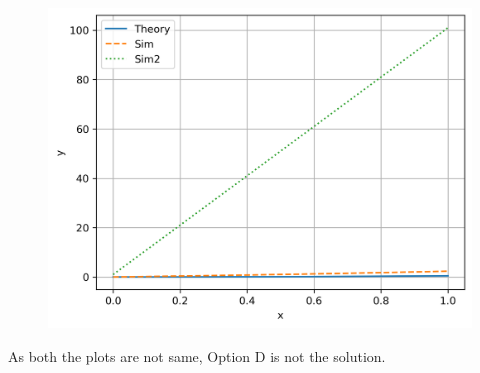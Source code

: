 \documentclass[journal]{IEEEtran}
\begin{document}
\begin{figure}[h]
    \centering
    \includegraphics[width=\textwidth]{figs/fig.png}
\end{figure}

As both the plots are not same, Option D is not the solution. \\
\end{document}
